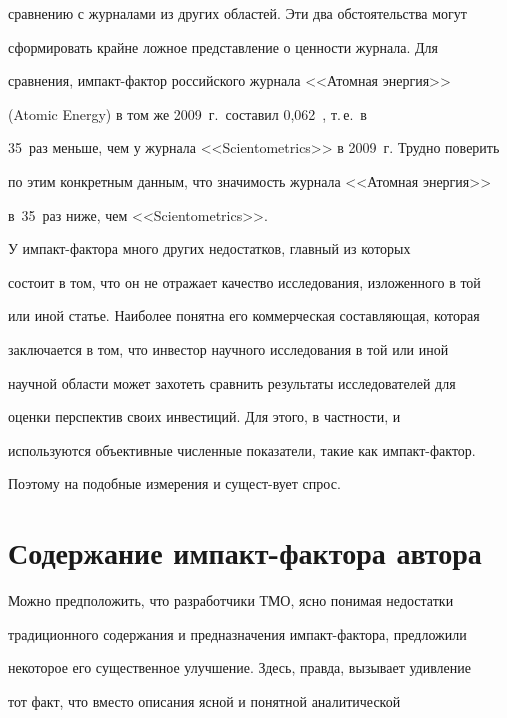 сравнению с журналами из других областей. Эти два обстоятельства могут 


сформировать крайне ложное представление о ценности журнала. Для 


сравнения, им\-пакт-фак\-тор российского журнала <<Атомная энергия>> 


(Atomic Energy) в том же 2009~г.\ составил 0,062~\cite{3-2-14}, т.\,е.\ в 


35~раз меньше, чем у журнала <<Scientometrics>> в 2009~г. Трудно поверить 


по этим конкретным данным, что значимость журнала <<Атомная энергия>> 


в~35~раз ниже, чем <<Scientometrics>>.


    


    У импакт-фактора много других недостатков, главный из которых 


состоит в том, что он не отражает качество исследования, изложенного в той 


или иной статье. Наиболее понятна его коммерческая составляющая, которая 


заключается в том, что инвестор научного исследования в той или иной 


научной области может захотеть сравнить результаты исследователей для 


оценки перспектив своих инвестиций. Для этого, в частности, и 


используются объективные численные показатели, такие как импакт-фактор. 


Поэтому на подобные измерения и сущест-\linebreak вует спрос.





\section{Содержание импакт-фактора автора}


    


    Можно предположить, что разработчики ТМО, ясно понимая недостатки 


традиционного содержания и предназначения импакт-фактора, предложили 


некоторое его существенное улучшение. Здесь, правда, вызывает удивление 


тот факт, что вместо описания ясной и понятной аналитической 


